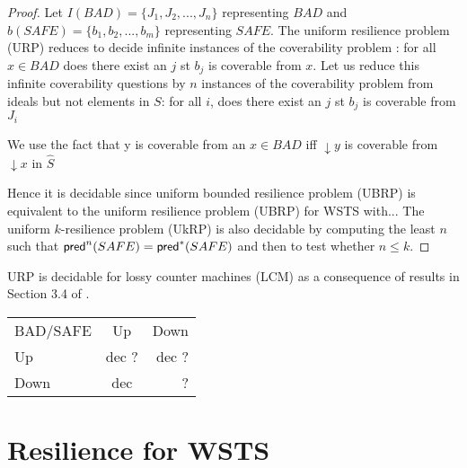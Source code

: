 \begin{proof}
Let $I(BAD)=\{J_1, J_2,...,J_n\}$ representing $BAD$ and  $b(SAFE)=\{b_1,b_2,...,b_m\}$ representing $SAFE$.
The uniform resilience problem (URP) reduces to decide infinite instances of the coverability problem : for all $x \in BAD$ does there exist an $j$ st $b_j$ is coverable from $x$. Let us reduce this infinite coverability questions by $n$ instances of the coverability problem from ideals but not elements in $S$: for all $i$, does there exist an $j$ st $b_j$ is coverable from $J_i$

We use the fact that y is coverable from an $x \in BAD$ iff $\downarrow y$ is coverable from $\downarrow x$ in $\hat{S}$


Hence it is decidable since
uniform bounded resilience problem (UBRP) is equivalent to the uniform resilience problem (UBRP) for WSTS with...
The uniform $k$-resilience problem (UkRP) is also decidable by computing the least $n$ such that $\textsf{pred}^n(SAFE)=\textsf{pred}^*(SAFE)$ and then to test whether $n \leq k$.
\end{proof}

URP is decidable for lossy counter machines (LCM) as a consequence of results in Section 3.4 of \cite{DBLP:conf/rp/Schnoebelen10}.

\begin{tabular}{ l c r }
   BAD/SAFE & Up & Down \\
   Up & dec ? & dec ? \\
   Down & dec & ? \\
 \end{tabular}




\section{Resilience for WSTS}


%
%

